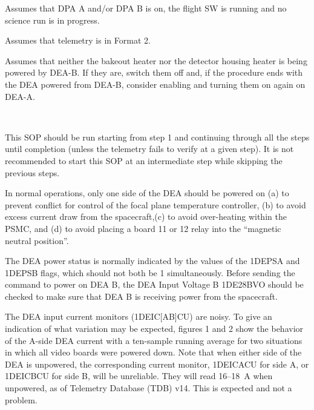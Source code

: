 \documentclass[11pt]{article}
\begin{document}
\vspace{0.15in}

\bi
\item Assumes that DPA A and/or DPA B is on, the flight SW is running and no 
science run is in progress.
\ei

\vspace{0.15in}

\bi
\item Assumes that telemetry is in Format 2.
\item Assumes that neither the bakeout heater nor the detector housing heater is
being powered by DEA-B. If they are, switch them off and, if the procedure ends
with the DEA powered from DEA-B, consider enabling and turning them on again
on DEA-A.
\ei

\normalsize
{} \\
\normalsize

This SOP should be run starting from step 1 and continuing through all the steps 
until completion (unless the telemetry fails to verify at a given step). It is 
not recommended to start this SOP at an intermediate step while skipping the previous steps.

In normal operations, only one side of the DEA should be powered on
(a) to prevent conflict for control of the focal plane temperature controller,
(b) to avoid excess current draw from the spacecraft,(c) to avoid over-heating
within the PSMC, and (d) to avoid placing a board 11 or 12 relay into the 
``magnetic neutral position''.

The DEA power status is normally indicated by the values of the 1DEPSA and
1DEPSB flags, which should not both be 1 simultaneously. Before sending the 
command to power on DEA B, the DEA Input Voltage B 1DE28BVO should 
be checked to make sure that DEA B is receiving power from the spacecraft.

The DEA input current monitors (1DEIC[AB]CU) are noisy.
To give an indication of what variation may be expected, figures 1 and 2
show the behavior of the A-side DEA current with a ten-sample running
average for two situations in which all video boards were powered down. Note that
when either side of the DEA is unpowered, the corresponding current monitor, 
1DEICACU for side A, or 1DEICBCU for side B, will be unreliable. They will read
16--18~A when unpowered, as of Telemetry Database (TDB) v14. This is expected and
not a problem.
\end{document}
